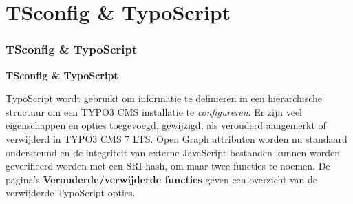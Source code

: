 %

\section{TSconfig \& TypoScript}
\begin{frame}[fragile]
	\frametitle{TSconfig \& TypoScript}

	\begin{center}\huge{\color{typo3darkgrey}\textbf{TSconfig \& TypoScript}}\end{center}

	TypoScript wordt gebruikt om informatie te definiëren in een hiërarchische structuur
	om een TYPO3 CMS installatie te \textit{configureren}. Er zijn veel eigenschappen en
	opties toegevoegd, gewijzigd, als verouderd aangemerkt of verwijderd in TYPO3 CMS 7
	LTS.\newline
	Open Graph attributen worden nu standaard ondersteund en de integriteit van externe
	JavaScript-bestanden kunnen worden geverifieerd worden met een SRI-hash, om maar
	twee functies te noemen.\newline
	De pagina's \textbf{Verouderde/verwijderde functies} geven een overzicht van de
	verwijderde TypoScript opties.

\end{frame}

